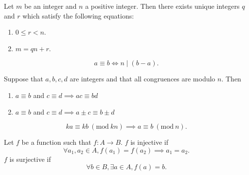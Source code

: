 \documentclass[14pt]{extarticle}
\newcommand{\Mod}[1]{\ (\mathrm{mod}\ #1)}
\begin{document}
\begin{definition}
	Let $m$ be an integer and $n$ a positive integer. Then there exists unique integers $q$ and $r$ which satisfy the following equations:
	\begin{enumerate}
		\item $0 \leq r < n$.
		\item $m = qn + r$.
	\end{enumerate}
\end{definition}

\begin{theorem}
	\[
		a \equiv b \Longleftrightarrow n \mid (b-a)
	.\]
\end{theorem}

\begin{theorem}
	Suppose that $a,b,c,d$ are integers and that all congruences are modulo $n$. Then
	\begin{enumerate}
		\item $a \equiv b$ and $c \equiv d \implies ac \equiv bd$
		\item $a \equiv b$ and $c \equiv d \implies a \pm c \equiv b \pm d$
	\end{enumerate}
\end{theorem}

\begin{theorem}
	\[
		ka \equiv kb \Mod{kn} \implies a \equiv b \Mod{n}
	.\]
\end{theorem}

\begin{definition}
	Let $f$ be a function such that $f : A \rightarrow B$. $f$ is injective if
	\[
		\forall a_1, a_2 \in A, f(a_1) = f(a_2) \implies a_1 = a_2
	.\]
	$f$ is surjective if
	\[
		\forall b \in B, \exists a \in A, f(a) = b
	.\]
\end{definition}
	
\end{document}
